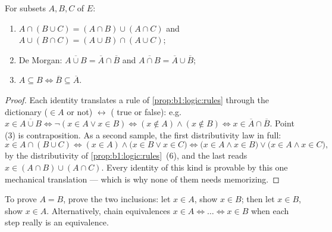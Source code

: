 \begin{proposition}\label{prop:b1:logic:setalgebra}
For subsets $A, B, C$ of $E$:
\begin{enumerate}
  \item $A \cap (B \cup C) = (A \cap B) \cup (A \cap C)$ and
        $A \cup (B \cap C) = (A \cup B) \cap (A \cup C)$;
  \item De Morgan: $\overline{A \cup B} = \overline{A} \cap
        \overline{B}$ and $\overline{A \cap B} = \overline{A} \cup
        \overline{B}$;
  \item $A \subseteq B \iff \overline{B} \subseteq \overline{A}$.
\end{enumerate}
\end{proposition}

\begin{proof}
Each identity translates a rule of \cref{prop:b1:logic:rules} through
the dictionary ($\in A$ or not) $\leftrightarrow$ ( true or
false): e.g.\ $x \in \overline{A \cup B} \iff \lnot(x \in A \lor x \in
B) \iff (x \notin A) \land (x \notin B) \iff x \in \overline{A} \cap
\overline{B}$. Point (3) is contraposition. As a second sample, the
first distributivity law in full:
\[
x \in A \cap (B \cup C)
\iff (x \in A) \land \bigl(x \in B \lor x \in C\bigr)
\iff \bigl(x \in A \land x \in B\bigr) \lor
\bigl(x \in A \land x \in C\bigr),
\]
by the distributivity of \cref{prop:b1:logic:rules}~(6), and the
last  reads $x \in (A \cap B) \cup (A \cap C)$. Every 
identity of this kind is provable by this one mechanical
translation --- which is why none of them needs memorizing.
\end{proof}

\begin{method}\label{met:b1:logic:doubleinc}
To prove $A = B$, prove the two inclusions: let $x \in A$, show $x \in
B$; then let $x \in B$, show $x \in A$. Alternatively, chain
equivalences $x \in A \iff \dots \iff x \in B$ when each step really is
an equivalence.
\end{method}

